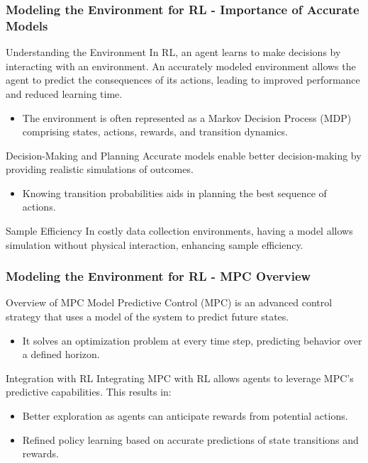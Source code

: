 \documentclass[aspectratio=169]{beamer}
\begin{document}
\begin{frame}[fragile]
    \frametitle{Modeling the Environment for RL - Importance of Accurate Models}
    \begin{block}{Understanding the Environment}
        In RL, an agent learns to make decisions by interacting with an environment. An accurately modeled environment allows the agent to predict the consequences of its actions, leading to improved performance and reduced learning time.
        \begin{itemize}
            \item The environment is often represented as a Markov Decision Process (MDP) comprising states, actions, rewards, and transition dynamics.
        \end{itemize}
    \end{block}
    
    \begin{block}{Decision-Making and Planning}
        Accurate models enable better decision-making by providing realistic simulations of outcomes.
        \begin{itemize}
            \item Knowing transition probabilities aids in planning the best sequence of actions.
        \end{itemize}
    \end{block}
    
    \begin{block}{Sample Efficiency}
        In costly data collection environments, having a model allows simulation without physical interaction, enhancing sample efficiency.
    \end{block}
\end{frame}

\begin{frame}[fragile]
    \frametitle{Modeling the Environment for RL - MPC Overview}
    \begin{block}{Overview of MPC}
        Model Predictive Control (MPC) is an advanced control strategy that uses a model of the system to predict future states.
        \begin{itemize}
            \item It solves an optimization problem at every time step, predicting behavior over a defined horizon.
        \end{itemize}
    \end{block}
    
    \begin{block}{Integration with RL}
        Integrating MPC with RL allows agents to leverage MPC's predictive capabilities. This results in:
        \begin{itemize}
            \item Better exploration as agents can anticipate rewards from potential actions.
            \item Refined policy learning based on accurate predictions of state transitions and rewards.
        \end{itemize}
    \end{block}
\end{frame}
\end{document}
